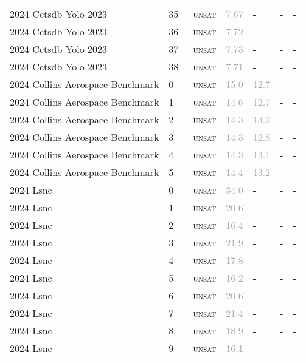 \begin{center}
{\begin{longtable}{@{}lllllll@{}}
2024 Cctsdb Yolo 2023 & 35 & ~\textsc{unsat} & \textcolor{darkgray}{7.67} & - & - & - \\
2024 Cctsdb Yolo 2023 & 36 & ~\textsc{unsat} & \textcolor{darkgray}{7.72} & - & - & - \\
2024 Cctsdb Yolo 2023 & 37 & ~\textsc{unsat} & \textcolor{darkgray}{7.73} & - & - & - \\
2024 Cctsdb Yolo 2023 & 38 & ~\textsc{unsat} & \textcolor{darkgray}{7.71} & - & - & - \\
\midrule
2024 Collins Aerospace Benchmark & 0 & ~\textsc{unsat} & \textcolor{darkgray}{15.0} & \textcolor{darkgray}{12.7} & - & - \\
2024 Collins Aerospace Benchmark & 1 & ~\textsc{unsat} & \textcolor{darkgray}{14.6} & \textcolor{darkgray}{12.7} & - & - \\
2024 Collins Aerospace Benchmark & 2 & ~\textsc{unsat} & \textcolor{darkgray}{14.3} & \textcolor{darkgray}{13.2} & - & - \\
2024 Collins Aerospace Benchmark & 3 & ~\textsc{unsat} & \textcolor{darkgray}{14.3} & \textcolor{darkgray}{12.8} & - & - \\
2024 Collins Aerospace Benchmark & 4 & ~\textsc{unsat} & \textcolor{darkgray}{14.3} & \textcolor{darkgray}{13.1} & - & - \\
2024 Collins Aerospace Benchmark & 5 & ~\textsc{unsat} & \textcolor{darkgray}{14.4} & \textcolor{darkgray}{13.2} & - & - \\
\midrule
2024 Lsnc & 0 & ~\textsc{unsat} & \textcolor{darkgray}{34.0} & - & - & - \\
2024 Lsnc & 1 & ~\textsc{unsat} & \textcolor{darkgray}{20.6} & - & - & - \\
2024 Lsnc & 2 & ~\textsc{unsat} & \textcolor{darkgray}{16.4} & - & - & - \\
2024 Lsnc & 3 & ~\textsc{unsat} & \textcolor{darkgray}{21.9} & - & - & - \\
2024 Lsnc & 4 & ~\textsc{unsat} & \textcolor{darkgray}{17.8} & - & - & - \\
2024 Lsnc & 5 & ~\textsc{unsat} & \textcolor{darkgray}{16.2} & - & - & - \\
2024 Lsnc & 6 & ~\textsc{unsat} & \textcolor{darkgray}{20.6} & - & - & - \\
2024 Lsnc & 7 & ~\textsc{unsat} & \textcolor{darkgray}{21.4} & - & - & - \\
2024 Lsnc & 8 & ~\textsc{unsat} & \textcolor{darkgray}{18.9} & - & - & - \\
2024 Lsnc & 9 & ~\textsc{unsat} & \textcolor{darkgray}{16.1} & - & - & - \\

\end{longtable}}
\end{center}
